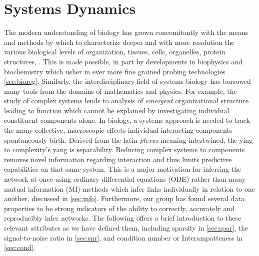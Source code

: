 % 
\section{Systems Dynamics}
\label{sec:sysdyn}
The modern understanding of biology has grown concomitantly with the means and methods by which to characterize deeper and with more resolution the various biological levels of organization, \eg tissues, cells, organelles, protein structures, \etc. This is made possible, in part by developments in biophysics and biochemistry which usher in ever more fine grained probing technologies \cref{sec:bioreg}. Similarly, the interdisciplinary field of systems biology has borrowed many tools from the domains of mathematics and physics. For example, the study of complex systems lends to analysis of \emph{emergent} organizational structure leading to function which cannot be explained by investigating individual constituent components alone. In biology, a systems approach is needed to track the many collective, macroscopic effects individual interacting components spontaneously birth. Derived from the latin \emph{plexus} meaning intertwined, the ying to complexity's yang is separability. Reducing complex systems to components removes novel information regarding interaction and thus limits predictive capabilities on that same system. This is a major motivation for inferring the network at once using ordinary differential equations (ODE) rather than many mutual information (MI) methods which infer links individually in relation to one another, discussed in \cref{sec:info}. Furthermore, our group has found several data properties to be strong indicators of the ability to correctly, accurately and reproducibly infer networks. The following offers a brief introduction to these relevant attributes as we have defined them, including sparsity in \cref{sec:spar}, the signal-to-noise ratio in \cref{sec:snr}, and condition number or Interampatteness in \cref{sec:cond}.


